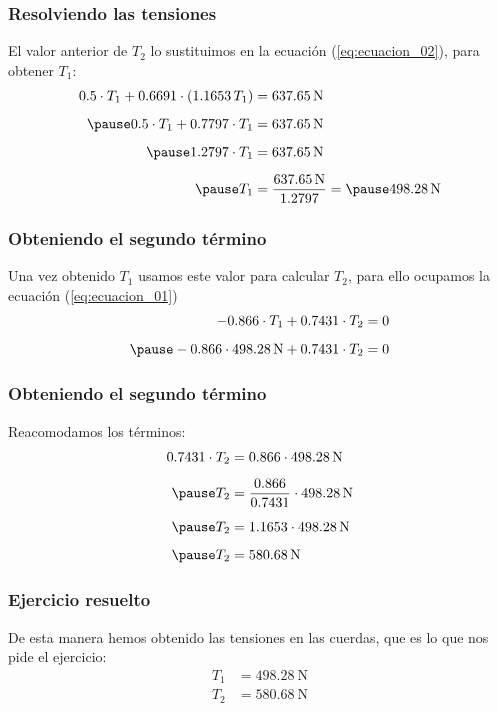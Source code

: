 \documentclass[12pt]{beamer}
\begin{document}
\begin{frame}
\frametitle{Resolviendo las tensiones}
El valor anterior de $T_{2}$ lo sustituimos en la ecuación (\ref{eq:ecuacion_02}), para obtener $T_{1}$:
\pause
\begin{eqnarray*}
\begin{aligned}
0.5 \cdot T_{1} + 0.6691 \cdot (1.1653 \, T_{1}) &= \SI{637.65}{\newton} \\[0.5em] \pause
0.5 \cdot T_{1} + 0.7797 \cdot T_{1} &= \SI{637.65}{\newton} \\[0.5em] \pause
1.2797 \cdot T_{1} &= \SI{637.65}{\newton} \\[0.5em] \pause
T_{1} &= \dfrac{\SI{637.65}{\newton}}{1.2797} = \pause \SI{498.28}{\newton}
\end{aligned}
\label{eq:ecuacion_03}
\end{eqnarray*}
\end{frame}
\begin{frame}
\frametitle{Obteniendo el segundo término}
Una vez obtenido $T_{1}$ usamos este valor para calcular $T_{2}$, para ello ocupamos la ecuación (\ref{eq:ecuacion_01})
\pause
\begin{eqnarray*}
\begin{aligned}
-0.866 \cdot T_{1} + 0.7431 \cdot T_{2} &= 0 \\[0.5em] \pause
-0.866 \cdot \SI{498.28}{\newton} + 0.7431 \cdot T_{2} &= 0
\end{aligned}
\end{eqnarray*}
\end{frame}
\begin{frame}
\frametitle{Obteniendo el segundo término}
Reacomodamos los términos:
\pause
\begin{eqnarray*}
\begin{aligned}
0.7431 \cdot T_{2} &= 0.866 \cdot \SI{498.28}{\newton} \\[0.5em] \pause
T_{2} &= \dfrac{0.866}{0.7431} \cdot \SI{498.28}{\newton} \\[0.5em] \pause
T_{2} &= 1.1653 \cdot \SI{498.28}{\newton} \\[0.5em] \pause
T_{2} &= \SI{580.68}{\newton}
\end{aligned}
\end{eqnarray*}
\end{frame}
\begin{frame}
\frametitle{Ejercicio resuelto}
De esta manera hemos obtenido las tensiones en las cuerdas, que es lo que nos pide el ejercicio:
\begin{align*}
T_{1} &= \SI{498.28}{\newton} \\[0.5em]
T_{2} &= \SI{580.68}{\newton}
\end{align*}
\end{frame}
\end{document}

